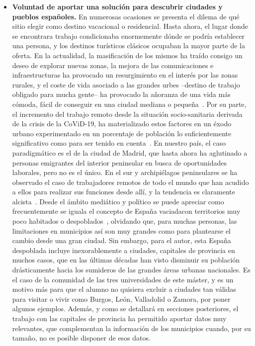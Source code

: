 \begin{itemize}
    \item \textbf{Voluntad de aportar una solución para descubrir ciudades y pueblos españoles.} En numerosas ocasiones se presenta el dilema de qué sitio elegir como destino vacacional o residencial. Hasta ahora, el lugar donde se encontrara trabajo condicionaba enormemente dónde se podría establecer una persona, y los destinos turísticos clásicos ocupaban la mayor parte de la oferta. En la actualidad, la masificación de los mismos ha traído consigo un deseo de explorar nuevas zonas, la mejora de las comunicaciones e infraestructuras ha provocado un resurgimiento en el interés por las zonas rurales, y el coste de vida asociado a las grandes urbes –destino de trabajo obligado para mucha gente– ha provocado la añoranza de una vida más cómoda, fácil de conseguir en una ciudad mediana o pequeña~\cite{elpais, terrenos}. Por su parte, el incremento del trabajo remoto desde la situación socio-sanitaria derivada de la crisis de la CoViD-19, ha materializado estos factores en un éxodo urbano experimentado en un porcentaje de población lo suficientemente significativo como para ser tenido en cuenta~\cite{innovando, 20mins}. En nuestro país, el caso paradigmático es el de la ciudad de Madrid, que hasta ahora ha aglutinado a personas emigrantes del interior peninsular en busca de oportunidades laborales, pero no es el único. En el sur y archipiélagos peninsulares se ha observado el caso de trabajadores remotos de todo el mundo que han acudido a ellos para realizar sus funciones desde allí, y la tendencia es claramente alcista~\cite{expansion}. Desde el ámbito mediático y político se puede apreciar como frecuentemente se iguala el concepto de \guillemotleft España vaciada\guillemotright\space con territorios muy poco habitados o despoblados~\cite{muycomputerpro}, olvidando que, para muchas personas, las limitaciones en municipios así son muy grandes como para plantearse el cambio desde una gran ciudad. Sin embargo, para el autor, esta España despoblada incluye inexorablemente a ciudades, capitales de provincia en muchos casos, que en las últimas décadas han visto disminuir su población drásticamente hacia los sumideros de las grandes áreas urbanas nacionales. Es el caso de la comunidad de las tres universidades de este máster, y es un motivo más para que el alumno no quisiera excluir a ciudades tan válidas para visitar o vivir como Burgos, León, Valladolid o Zamora, por poner algunos ejemplos. Además, y como se detallará en secciones posteriores, el trabajo con las capitales de provincia ha permitido aportar datos muy relevantes, que complementan la información de los municipios cuando, por su tamaño, no es posible disponer de esos datos.

\end{itemize}
